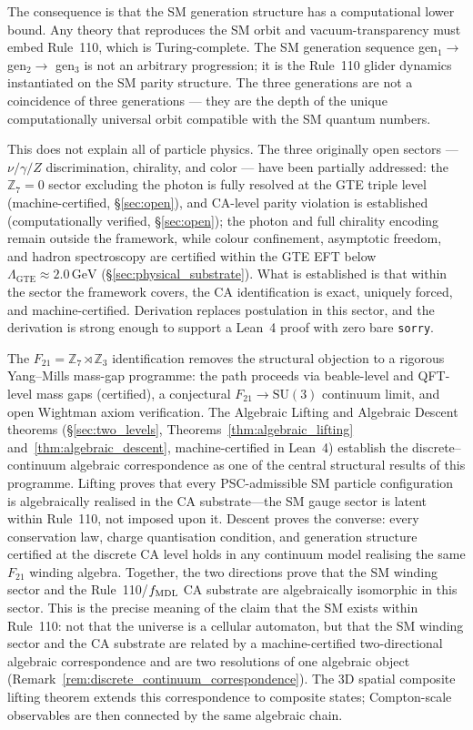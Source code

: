 \documentclass[11pt]{article}
\theoremstyle{remark}
\begin{document}
The consequence is that the SM generation structure has a computational lower bound.
Any theory that reproduces the SM orbit and vacuum-transparency must embed
Rule~110, which is Turing-complete. The SM generation sequence
gen$_1 \to$ gen$_2 \to$ gen$_3$ is not an arbitrary progression; it is the
Rule~110 glider dynamics instantiated on the SM parity structure. The three generations are
not a coincidence of three generations --- they are the depth of the
unique computationally universal orbit compatible with the SM quantum numbers.

This does not explain all of particle physics. The three originally open sectors ---
$\nu/\gamma/Z$ discrimination, chirality, and color --- have been partially addressed:
the $\mathbb{Z}_7 = 0$ sector excluding the photon is fully resolved at the GTE triple
level (machine-certified, \S\ref{sec:open}), and CA-level parity violation is established (computationally verified,
\S\ref{sec:open}); the photon and full chirality encoding remain outside the framework,
while colour confinement, asymptotic freedom, and hadron spectroscopy are certified
within the GTE EFT below $\Lambda_{\mathrm{GTE}} \approx 2.0\,\mathrm{GeV}$
(§\ref{sec:physical_substrate}).
What is established is that within the sector the framework covers, the CA
identification is exact, uniquely forced, and machine-certified. Derivation
replaces postulation in this sector, and the derivation is strong enough to
support a Lean~4 proof with zero bare \texttt{sorry}.

The $F_{21} = \mathbb{Z}_7 \rtimes \mathbb{Z}_3$ identification removes the structural
objection to a rigorous Yang--Mills mass-gap programme: the path proceeds via beable-level
and QFT-level mass gaps (certified), a conjectural $F_{21} \to \mathrm{SU}(3)$ continuum
limit, and open Wightman axiom verification.
The Algebraic Lifting and Algebraic Descent theorems
(§\ref{sec:two_levels}, Theorems~\ref{thm:algebraic_lifting} and~\ref{thm:algebraic_descent},
machine-certified in Lean~4) establish the discrete--continuum algebraic correspondence
as one of the central structural results of this programme.
Lifting proves that every PSC-admissible SM particle configuration is algebraically
realised in the CA substrate---the SM gauge sector is latent within Rule~110, not imposed upon it.
Descent proves the converse: every conservation law, charge quantisation condition, and
generation structure certified at the discrete CA level holds in any continuum model
realising the same $F_{21}$ winding algebra.
Together, the two directions prove that the SM winding sector and the Rule~110/$f_{\rm MDL}$
CA substrate are algebraically isomorphic in this sector.
This is the precise meaning of the claim that the SM exists within Rule~110: not that
the universe is a cellular automaton, but that the SM winding sector and the CA substrate
are related by a machine-certified two-directional algebraic correspondence and are two
resolutions of one algebraic object (Remark~\ref{rem:discrete_continuum_correspondence}).
The 3D spatial composite lifting theorem extends this correspondence to composite states;
Compton-scale observables are then connected by the same algebraic chain.
\end{document}
